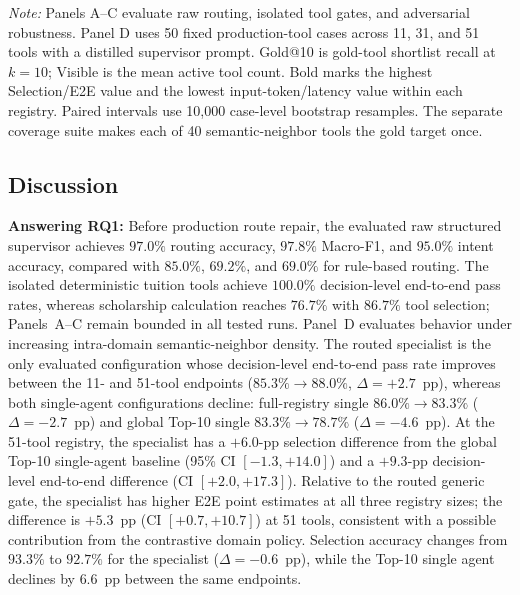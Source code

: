 \begin{table}[!htbp]
{\begin{tabular}{lccccccc}
\bottomrule
\end{tabular}
}
\medskip
\parbox{\columnwidth}{\footnotesize\emph{Note:} Panels A--C evaluate raw routing, isolated tool gates, and adversarial robustness. Panel D uses 50 fixed production-tool cases across 11, 31, and 51 tools with a distilled supervisor prompt. Gold@10 is gold-tool shortlist recall at $k=10$; Visible is the mean active tool count. Bold marks the highest Selection/E2E value and the lowest input-token/latency value within each registry. Paired intervals use 10,000 case-level bootstrap resamples. The separate coverage suite makes each of 40 semantic-neighbor tools the gold target once.}
\end{table}

\subsection{Discussion}
\label{sec:discussion}

\textbf{Answering RQ1:} Before production route repair, the evaluated raw structured supervisor achieves $97.0\%$ routing accuracy, $97.8\%$ Macro-F1, and $95.0\%$ intent accuracy, compared with $85.0\%$, $69.2\%$, and $69.0\%$ for rule-based routing. The isolated deterministic tuition tools achieve $100.0\%$ decision-level end-to-end pass rates, whereas scholarship calculation reaches $76.7\%$ with $86.7\%$ tool selection; Panels~A--C remain bounded in all tested runs. Panel~D evaluates behavior under increasing intra-domain semantic-neighbor density. The routed specialist is the only evaluated configuration whose decision-level end-to-end pass rate improves between the 11- and 51-tool endpoints ($85.3\% \rightarrow 88.0\%$, $\Delta=+2.7$~pp), whereas both single-agent configurations decline: full-registry single $86.0\% \rightarrow 83.3\%$ ($\Delta=-2.7$~pp) and global Top-10 single $83.3\% \rightarrow 78.7\%$ ($\Delta=-4.6$~pp). At the 51-tool registry, the specialist has a $+6.0$-pp selection difference from the global Top-10 single-agent baseline (95\% CI $[-1.3,+14.0]$) and a $+9.3$-pp decision-level end-to-end difference (CI $[+2.0,+17.3]$). Relative to the routed generic gate, the specialist has higher E2E point estimates at all three registry sizes; the difference is $+5.3$~pp (CI $[+0.7,+10.7]$) at 51 tools, consistent with a possible contribution from the contrastive domain policy. Selection accuracy changes from $93.3\%$ to $92.7\%$ for the specialist ($\Delta=-0.6$~pp), while the Top-10 single agent declines by $6.6$~pp between the same endpoints.

